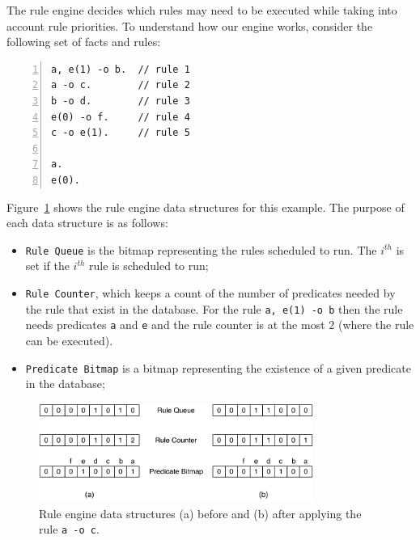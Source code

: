 The rule engine decides which rules may need to be executed while taking into
account rule priorities. To understand how our engine works, consider the
following set of facts and rules:

\begin{Verbatim}[numbers=left,fontsize=\codesize]
a, e(1) -o b.  // rule 1
a -o c.        // rule 2
b -o d.        // rule 3
e(0) -o f.     // rule 4
c -o e(1).     // rule 5

a.
e(0).
\end{Verbatim}

Figure~\ref{fig:implementation:rule_engine} shows the rule engine data
structures for this example. The purpose of each data structure is as follows:

\begin{itemize}

   \item \texttt{Rule Queue} is the bitmap representing the rules scheduled to
      run. The $i^{th}$ is set if the $i^{th}$ rule is scheduled to run;

   \item \texttt{Rule Counter}, which keeps a count of the number of predicates
      needed by the rule that exist in the database. For the rule
      \texttt{a, e(1) -o b} then the rule needs predicates \texttt{a} and
      \texttt{e} and the rule counter is at the most 2 (where the rule can be
      executed).

   \item \texttt{Predicate Bitmap} is a bitmap representing the existence of a
      given predicate in the database;

\end{itemize}

\begin{figure}[t]
   \centering
   \includegraphics[width=0.8\textwidth]{figures/implementation/rule_queue.pdf}
   \caption{Rule engine data structures (a) before and (b) after applying 
      the rule \texttt{a -o c}.}
   \label{fig:implementation:rule_engine}
\end{figure}

